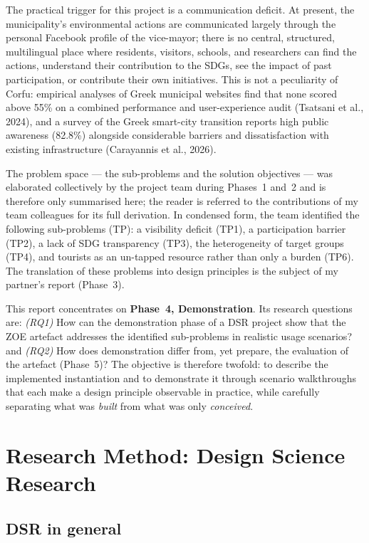 \documentclass[11pt,a4paper]{article}
\begin{document}
The practical trigger for this project is a communication deficit. At present, the municipality's environmental actions are communicated largely through the personal Facebook profile of the vice-mayor; there is no central, structured, multilingual place where residents, visitors, schools, and researchers can find the actions, understand their contribution to the SDGs, see the impact of past participation, or contribute their own initiatives. This is not a peculiarity of Corfu: empirical analyses of Greek municipal websites find that none scored above 55\% on a combined performance and user-experience audit (Tsatsani et al., 2024), and a survey of the Greek smart-city transition reports high public awareness (82.8\%) alongside considerable barriers and dissatisfaction with existing infrastructure (Carayannis et al., 2026).

The problem space --- the sub-problems and the solution objectives --- was elaborated collectively by the project team during Phases~1 and~2 and is therefore only summarised here; the reader is referred to the contributions of my team colleagues for its full derivation. In condensed form, the team identified the following sub-problems (TP): a visibility deficit (TP1), a participation barrier (TP2), a lack of SDG transparency (TP3), the heterogeneity of target groups (TP4), and tourists as an un-tapped resource rather than only a burden (TP6). The translation of these problems into design principles is the subject of my partner's report (Phase~3).

This report concentrates on \textbf{Phase~4, Demonstration}. Its research questions are: \emph{(RQ1)} How can the demonstration phase of a DSR project show that the ZOE artefact addresses the identified sub-problems in realistic usage scenarios? and \emph{(RQ2)} How does demonstration differ from, yet prepare, the evaluation of the artefact (Phase~5)? The objective is therefore twofold: to describe the implemented instantiation and to demonstrate it through scenario walkthroughs that each make a design principle observable in practice, while carefully separating what was \emph{built} from what was only \emph{conceived}.

\section{Research Method: Design Science Research}

\subsection{DSR in general}
\end{document}

